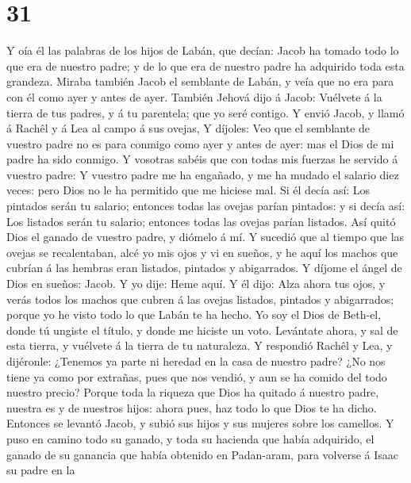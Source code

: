 \hypertarget{section-30}{%
\section{31}\label{section-30}}

 Y oía él las palabras de los hijos de Labán, que decían:
Jacob ha tomado todo lo que era de nuestro padre; y de lo que era de
nuestro padre ha adquirido toda esta grandeza.  Miraba
también Jacob el semblante de Labán, y veía que no era para con él como
ayer y antes de ayer.  También Jehová dijo á Jacob: Vuélvete
á la tierra de tus padres, y á tu parentela; que yo seré contigo.
 Y envió Jacob, y llamó á Rachêl y á Lea al campo á sus
ovejas,  Y díjoles: Veo que el semblante de vuestro padre no
es para conmigo como ayer y antes de ayer: mas el Dios de mi padre ha
sido conmigo.  Y vosotras sabéis que con todas mis fuerzas
he servido á vuestro padre:  Y vuestro padre me ha engañado,
y me ha mudado el salario diez veces: pero Dios no le ha permitido que
me hiciese mal.  Si él decía así: Los pintados serán tu
salario; entonces todas las ovejas parían pintados: y si decía así: Los
listados serán tu salario; entonces todas las ovejas parían listados.
 Así quitó Dios el ganado de vuestro padre, y diómelo á mí.
 Y sucedió que al tiempo que las ovejas se recalentaban,
alcé yo mis ojos y vi en sueños, y he aquí los machos que cubrían á las
hembras eran listados, pintados y abigarrados.  Y díjome el
ángel de Dios en sueños: Jacob. Y yo dije: Heme aquí.  Y él
dijo: Alza ahora tus ojos, y verás todos los machos que cubren á las
ovejas listados, pintados y abigarrados; porque yo he visto todo lo que
Labán te ha hecho.  Yo soy el Dios de Beth-el, donde tú
ungiste el título, y donde me hiciste un voto. Levántate ahora, y sal de
esta tierra, y vuélvete á la tierra de tu naturaleza.  Y
respondió Rachêl y Lea, y dijéronle: ¿Tenemos ya parte ni heredad en la
casa de nuestro padre?  ¿No nos tiene ya como por extrañas,
pues que nos vendió, y aun se ha comido del todo nuestro precio?
 Porque toda la riqueza que Dios ha quitado á nuestro
padre, nuestra es y de nuestros hijos: ahora pues, haz todo lo que Dios
te ha dicho.  Entonces se levantó Jacob, y subió sus hijos
y sus mujeres sobre los camellos.  Y puso en camino todo su
ganado, y toda su hacienda que había adquirido, el ganado de su ganancia
que había obtenido en Padan-aram, para volverse á Isaac su padre en la
